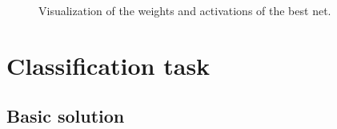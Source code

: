 \documentclass[a4paper, 11pt]{article}
\begin{document}
    \begin{figure}
      \centering
       \quad
      \caption{Visualization of the weights and activations of the best net.}
      \label{fig:r:visualization}
    \end{figure}


\section{Classification task}
  \subsection{Basic solution}
\end{document}
